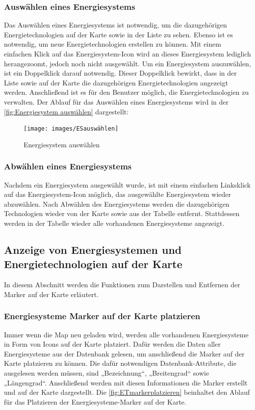 \subsubsection{Auswählen eines Energiesystems}
Das Auswählen eines Energiesystems ist notwendig, um die dazugehörigen Energietechnologien auf der Karte sowie in der Liste zu sehen. Ebenso ist es notwendig, um neue Energietechnologien erstellen zu können.
Mit einem einfachen Klick auf das Energiesystem-Icon wird an dieses Energiesystem lediglich herangezoomt, jedoch noch nicht ausgewählt.
Um ein Energiesystem auszuwählen, ist ein Doppelklick darauf notwendig. Dieser Doppelklick bewirkt, dass in der Liste sowie auf der Karte die dazugehörigen Energietechnologien angezeigt werden. Anschließend ist es für den Benutzer möglich, die Energietechnologien zu verwalten. Der Ablauf für das Auswählen eines Energiesystems wird in der \autoref{fig:Energiesystem auswählen} dargestellt:
\newline
\begin{figure}[h]
	\centering
	\texttt{[image: images/ESauswählen]}
	\caption{Energiesystem auswählen}
	\label{fig:Energiesystem auswählen}
\end{figure}


\subsubsection{Abwählen eines Energiesystems}
Nachdem ein Energiesystem ausgewählt wurde, ist mit einem einfachen Linksklick auf das Energiesystem-Icon möglich, das ausgewählte Energiesystem wieder abzuwählen. Nach Abwählen des Energiesystems werden die dazugehörigen Technologien wieder von der Karte sowie aus der Tabelle entfernt. Stattdessen werden in der Tabelle wieder alle vorhandenen Energiesysteme angezeigt.



\newpage
\subsection{Anzeige von Energiesystemen und Energietechnologien auf der Karte}
In diesem Abschnitt werden die Funktionen zum Darstellen und Entfernen der Marker auf der Karte erläutert.



\subsubsection{Energiesysteme Marker auf der Karte platzieren}
Immer wenn die Map neu geladen wird, werden alle vorhandenen Energiesysteme in Form von Icons auf der Karte platziert. Dafür werden die Daten aller Energiesysteme aus der Datenbank gelesen, um anschließend die Marker auf der Karte platzieren zu können. Die dafür notwendigen Datenbank-Attribute, die ausgelesen werden müssen, sind „Bezeichnung“, „Breitengrad“ sowie „Längengrad“. Anschließend werden mit diesen Informationen die Marker erstellt und auf der Karte dargestellt. Die \autoref{fig:ETmarkerplatzieren} beinhaltet den Ablauf für das Platzieren der Energiesysteme-Marker auf der Karte.


